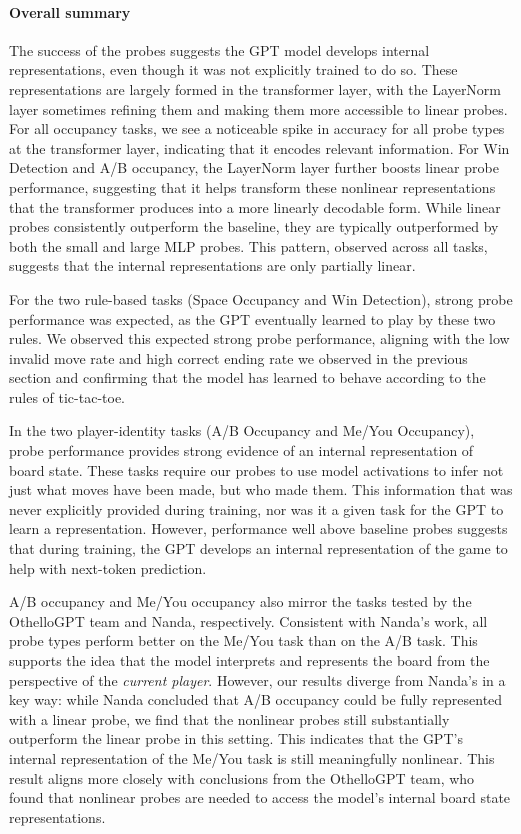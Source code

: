 \documentclass[11pt]{article}
\begin{document}
    \paragraph{Overall summary}\label{overall-summary}

The success of the probes suggests the GPT model develops internal
representations, even though it was not explicitly trained to do so.
These representations are largely formed in the transformer layer, with
the LayerNorm layer sometimes refining them and making them more
accessible to linear probes. For all occupancy tasks, we see a
noticeable spike in accuracy for all probe types at the transformer
layer, indicating that it encodes relevant information. For Win
Detection and A/B occupancy, the LayerNorm layer further boosts linear
probe performance, suggesting that it helps transform these nonlinear
representations that the transformer produces into a more linearly
decodable form. While linear probes consistently outperform the
baseline, they are typically outperformed by both the small and large
MLP probes. This pattern, observed across all tasks, suggests that the
internal representations are only partially linear.

For the two rule-based tasks (Space Occupancy and Win Detection), strong
probe performance was expected, as the GPT eventually learned to play by
these two rules. We observed this expected strong probe performance,
aligning with the low invalid move rate and high correct ending rate we
observed in the previous section and confirming that the model has
learned to behave according to the rules of tic-tac-toe.

In the two player-identity tasks (A/B Occupancy and Me/You Occupancy),
probe performance provides strong evidence of an internal representation
of board state. These tasks require our probes to use model activations
to infer not just what moves have been made, but who made them. This
information that was never explicitly provided during training, nor was
it a given task for the GPT to learn a representation. However,
performance well above baseline probes suggests that during training,
the GPT develops an internal representation of the game to help with
next-token prediction.

A/B occupancy and Me/You occupancy also mirror the tasks tested by the
OthelloGPT team and Nanda, respectively. Consistent with Nanda's work,
all probe types perform better on the Me/You task than on the A/B task.
This supports the idea that the model interprets and represents the
board from the perspective of the \emph{current player}. However, our
results diverge from Nanda's in a key way: while Nanda concluded that
A/B occupancy could be fully represented with a linear probe, we find
that the nonlinear probes still substantially outperform the linear
probe in this setting. This indicates that the GPT's internal
representation of the Me/You task is still meaningfully nonlinear. This
result aligns more closely with conclusions from the OthelloGPT team,
who found that nonlinear probes are needed to access the model's
internal board state representations.
\end{document}
